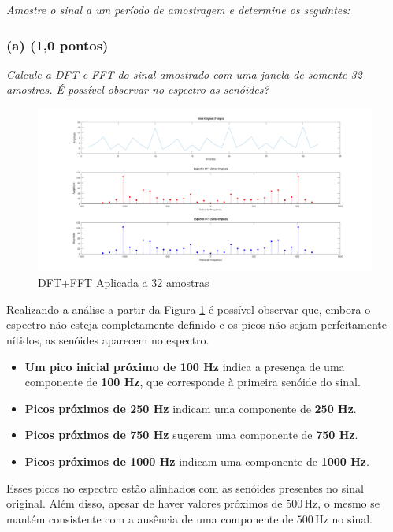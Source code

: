 \textit{Amostre o sinal  a um período de amostragem e determine os seguintes:}

\subsubsection*{(a) \textbf{(1,0 pontos) }}
\textit{Calcule a DFT e FFT do sinal amostrado com uma janela de somente 32 amostras. É possível observar no espectro as senóides?}

\begin{figure}[H]
    \centering
    \includegraphics[width=1\linewidth]{03_experimental_analysis//assets/plot_results/32_samples_dft_fft.png}
    \caption{DFT+FFT Aplicada a 32 amostras}
    \label{fig:signal_32samples_fft-dft}
\end{figure}

Realizando a análise a partir da Figura \ref{fig:signal_32samples_fft-dft} é possível observar que, embora o espectro não esteja completamente definido e os picos não sejam perfeitamente nítidos, as senóides aparecem no espectro.

\begin{itemize}
    \item \textbf{Um pico inicial próximo de 100 Hz} indica a presença de uma componente de \textbf{100 Hz}, que corresponde à primeira senóide do sinal.
    \item \textbf{Picos próximos de 250 Hz} indicam uma componente de \textbf{250 Hz}.
    \item \textbf{Picos próximos de 750 Hz} sugerem uma componente de \textbf{750 Hz}.
    \item \textbf{Picos próximos de 1000 Hz} indicam uma componente de \textbf{1000 Hz}.
\end{itemize}

Esses picos no espectro estão alinhados com as senóides presentes no sinal original. Além disso, apesar de haver valores próximos de $500 \, \text{Hz}$, o mesmo se mantém consistente com a ausência de uma componente de $500 \, \text{Hz}$ no sinal.

